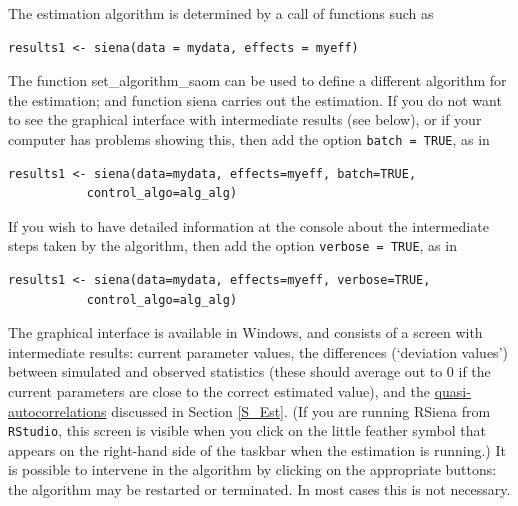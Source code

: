 \documentclass[a4paper,fleqn,11pt]{article}
\newcommand{\+}{\, + \,}
\newcommand{\sfn}[1]{\textsf{#1}}
\newcommand{\RS}{{\sf \textsf{RSiena} }}
\newcommand{\si}{{\sf SIENA}}
\begin{document}

The estimation algorithm is determined by a call of functions
such as
\begin{verbatim}
results1 <- siena(data = mydata, effects = myeff)
\end{verbatim}
The function \textsf{set\_algorithm\_saom} can be used to  define
a different algorithm for the estimation; and function  \textsf{siena}
carries out the estimation.
If you do not want to see the graphical interface with intermediate
results (see below), or if your computer has problems showing this, then add
the option \texttt{batch = TRUE}, as in
\begin{verbatim}
results1 <- siena(data=mydata, effects=myeff, batch=TRUE,
           control_algo=alg_alg)
\end{verbatim}
If you wish to have detailed information at the console about the intermediate
steps taken by the algorithm, then add
the option \texttt{verbose = TRUE}, as in
\begin{verbatim}
results1 <- siena(data=mydata, effects=myeff, verbose=TRUE,
           control_algo=alg_alg)
\end{verbatim}

The graphical interface is available in Windows, and consists of a
screen with intermediate results: current parameter values, the
differences (`deviation values') between simulated and observed
statistics (these should average out to 0 if the current
parameters are close to the correct estimated value), and the
\hyperlink{T_quasiac}{quasi-autocorrelations} discussed in Section
\ref{S_Est}.
(If you are running \RS from \texttt{RStudio}, this screen is visible
when you click on the little feather symbol that appears on the right-hand side
of the taskbar when the estimation is running.)
It is possible to intervene in the algorithm by clicking on the
appropriate buttons:
the algorithm may be restarted or terminated. In most cases
this is not necessary.
\end{document}
